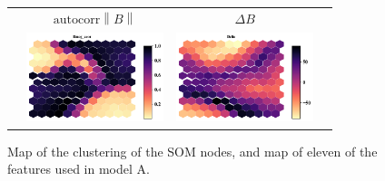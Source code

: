 \documentclass[utf8]{frontiersSCNS} %
\begin{document}
\begin{figure}[h!]
\begin{tabular}{CCCC}
		\\
		& $\text{autocorr} \left\lVert B \right\rVert$ & $\Delta B$ & \\
		& \includegraphics[width=4cm]{Amaya/comp-map-Bmag_acor} &
		\includegraphics[width=4cm]{Amaya/comp-map-Delta} & \hfill
		\\
	\end{tabular}
	\caption{Map of the clustering of the SOM nodes, and map of eleven of the features used in model A.}\label{fig:compmap}
\end{figure}
\end{document}

